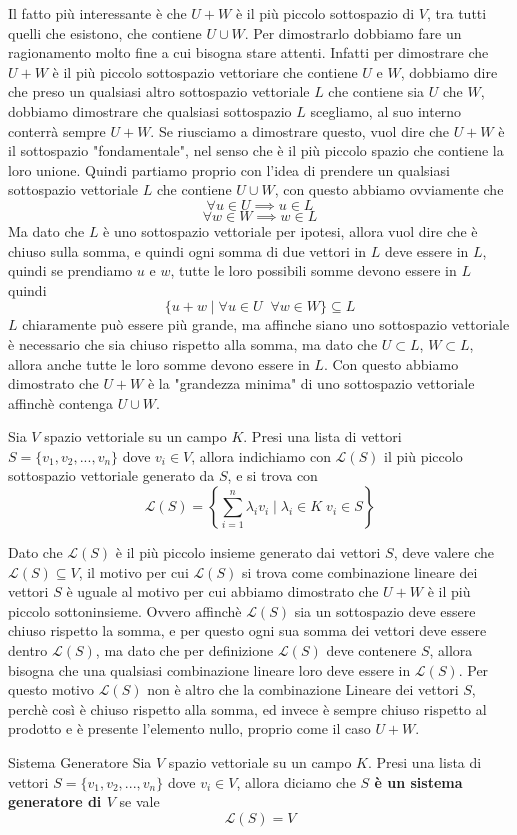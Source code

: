 \documentclass{rapport}
\begin{document}
Il fatto più interessante è che $U+W$ è il più piccolo sottospazio di $V$, tra tutti quelli che esistono, che contiene $U\cup W$. Per dimostrarlo dobbiamo fare un ragionamento molto fine a cui bisogna stare attenti. Infatti per dimostrare che $U+W$ è il più piccolo sottospazio vettoriare che contiene $U$ e $W$, dobbiamo dire che preso un qualsiasi altro sottospazio vettoriale $L$ che contiene sia $U$ che $W$, dobbiamo dimostrare che qualsiasi sottospazio $L$ scegliamo, al suo interno conterrà sempre $U+W$. Se riusciamo a dimostrare questo, vuol dire che $U+W$ è il sottospazio "fondamentale", nel senso che è il più piccolo spazio che contiene la loro unione. Quindi partiamo proprio con l'idea di prendere un qualsiasi sottospazio vettoriale $L$ che contiene $U\cup W$, con questo abbiamo ovviamente che 
\[
\forall u \in U \implies u \in L 
\]
\[
\forall w \in W \implies w \in L 
\]
Ma dato che  $L$ è uno sottospazio vettoriale per ipotesi, allora vuol dire che è chiuso sulla somma, e quindi ogni somma di due vettori in $L$ deve essere in $L$, quindi se prendiamo $u$ e $w$, tutte le loro possibili somme devono essere in $L$ quindi 
\[
\{u+w \;|\;\forall u \in U \;\;\forall w \in W \} \subseteq L
\]
$L$ chiaramente può essere più grande, ma affinche siano uno sottospazio vettoriale è necessario che sia chiuso rispetto alla somma, ma dato che $U \subset L$, $W \subset L$, allora anche tutte le loro somme devono essere in $L$. Con questo abbiamo dimostrato che $U+W$ è la "grandezza minima" di uno sottospazio vettoriale affinchè contenga $U\cup W$.

\begin{definizione}{}{}
  Sia $V$ spazio vettoriale su un campo $K$. Presi una lista di vettori $S = \{v_1, v_2, ..., v_n\}$ dove $v_i \in V$, allora indichiamo con $\mathcal{L}(S)$ il più piccolo sottospazio vettoriale generato da $S$, e si trova con 
  \[
  \mathcal{L}(S) = \left\{\sum_{i=1}^{n} \lambda_i v_i \;| \;\lambda_i \in K\; v_i \in S\right\}
  \]
\end{definizione}

Dato che $\mathcal{L}(S)$ è il più piccolo insieme generato dai vettori $S$, deve valere che $\mathcal{L}(S) \subseteq V$, il motivo per cui $\mathcal{L}(S)$ si trova come combinazione lineare dei vettori $S$ è uguale al motivo per cui abbiamo dimostrato che $U+W$ è il più piccolo sottoninsieme. Ovvero affinchè $\mathcal{L}(S)$ sia un sottospazio deve essere chiuso rispetto la somma, e per questo ogni sua somma dei vettori deve essere dentro $\mathcal{L}(S)$, ma dato che per definizione $\mathcal{L}(S)$ deve contenere $S$, allora bisogna che una qualsiasi combinazione lineare loro deve essere in $\mathcal{L}(S)$. Per questo motivo $\mathcal{L}(S)$ non è altro che la combinazione Lineare dei vettori $S$, perchè così è chiuso rispetto alla somma, ed invece è sempre chiuso rispetto al prodotto e è presente l'elemento nullo, proprio come il caso $U+W$.
\newpage
\begin{definizione}{Sistema Generatore}{}
  Sia $V$ spazio vettoriale su un campo $K$. Presi una lista di vettori $S = \{v_1, v_2, ..., v_n\}$ dove $v_i \in V$, allora diciamo che \textbf{$S$ è un sistema generatore di $V$} se vale 
  \[
  \mathcal{L}(S) = V
  \]
\end{definizione}
\end{document}

